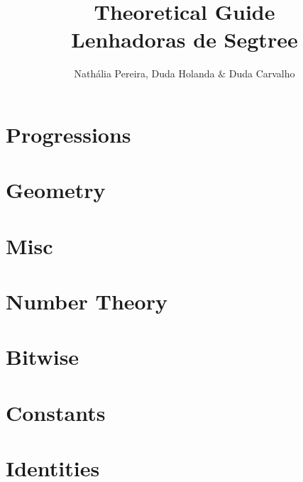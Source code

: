 \documentclass[10pt, twocolumn]{article}
\title{\vspace{-2cm}\textbf{Theoretical Guide\\Lenhadoras de Segtree}}
\author{Nathália Pereira, Duda Holanda $\&$ Duda Carvalho}
\date{}
\begin{document}
\maketitle
\tableofcontents\section{Progressions}


\section{Geometry}







\section{Misc}


\section{Number Theory}











\section{Bitwise}




\section{Constants}

\section{Identities}

\end{document}
